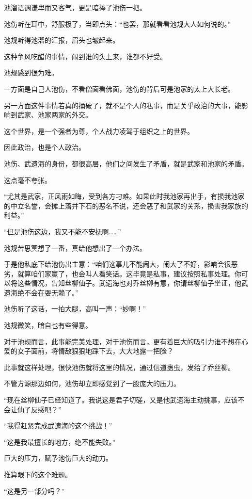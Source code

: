 \begin{this_body}
池溜语调谦卑而又客气，更是暗捧了池伤一把。

池伤听在耳中，舒服极了，当即点头：“也罢，那就看看池规大人如何说的。”

池规听得池溜的汇报，眉头也皱起来。

这种争风吃醋的事情，闹到谁的头上来，谁都不好受。

池规感到很为难。

一方面是自己人池伤，不看僧面看佛面，池伤的背后可是池家的太上大长老。

另一方面这件事情若真的捅破了，就不是个人的私事，而是关乎政治的大事，能影响到武家、池家两家的外交。

这个世界，是一个强者为尊，个人战力凌驾于组织之上的世界。

因此政治，也是个人政治。

池伤、武遗海的身份，都很高层，他们之间发生了矛盾，就是武家和池家的矛盾。

这点毫不夸张。

“尤其是武家，正风雨如晦，受到各方刁难。如果此时我池家再出手，有损我池家的中立名誉，会摊上落井下石的恶名不说，还会恶了和武家的关系，损害我家族的利益。”

“但是池伤这边，我又不能不安抚啊……”

池规苦思冥想了一番，真给他想出了一个办法。

于是他私底下给池伤出主意：“咱们这事儿不能闹大，闹大了不好，影响会很恶劣，就算咱们家赢了，也会叫人看笑话。这毕竟是私事，建议按照私事处理。你可以将这些情况，告知丝柳仙子。武遗海也对乔丝柳有意，你请丝柳仙子坐证，他武遗海绝不会在耍无赖了。”

池伤听了这话，一拍大腿，高叫一声：“妙啊！”

池规微笑，暗自也有些得意。

对于池规而言，此事能完美处理，对于池伤而言，更有着巨大的吸引力谁不想在心爱的女子面前，将情敌狠狠地踩下去，大大地露一把脸？

此事就这样处理，很快池伤就将这里的情况，通过信道蛊虫，发给了乔丝柳。

不管方源那边如何，池伤却立即感觉到了一股庞大的压力。

“现在丝柳仙子已经知道了。我说这是君子切磋，又是他武遗海主动挑事，应该不会让仙子反感吧？”

“我得赶紧完成武遗海的这个挑战！”

“这是我最擅长的地方，绝不能失败。”

巨大的压力，赋予池伤巨大的动力。

推算眼下的这个难题。

“这是另一部分吗？”


\end{this_body}
